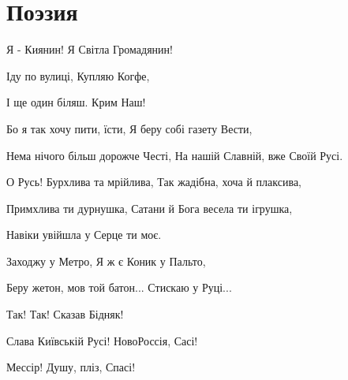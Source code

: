  
 

\part{Поэзия}


Я - Киянин!
Я Світла Громадянин!

Іду по вулиці,
Купляю Когфе,

І ще один біляш. Крим Наш!

Бо я так хочу пити, їсти,
Я беру собі газету Вести,

Нема нічого більш дорожче Честі,
На нашій Славній, вже Своїй Русі.

О Русь! Бурхлива та мрійлива,
Так жадібна, хоча й плаксива,

Примхлива ти дурнушка,
Сатани й Бога весела ти ігрушка,

Навіки увійшла у Серце ти моє.

Заходжу у Метро,
Я ж є Коник у Пальто,

Беру жетон, мов той батон...
Стискаю у Руці...

Так! Так! Сказав Бідняк!

Слава Київській Русі! НовоРоссія, Сасі!

Мессір! Душу, пліз, Спасі!





